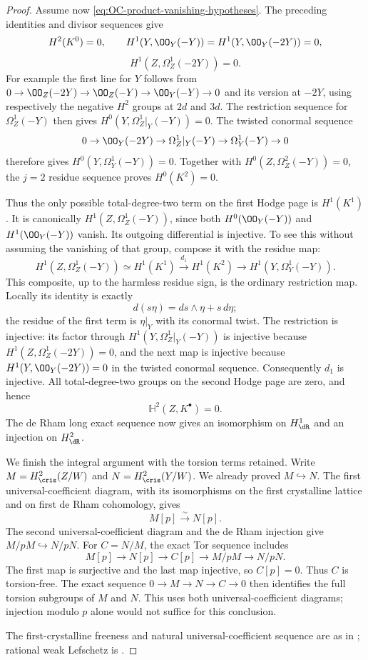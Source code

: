 \begin{proof}
Assume now \eqref{eq:OC-product-vanishing-hypotheses}.  The preceding identities and divisor sequences give
\[
 H^2(K^0)=0,\qquad
 H^1(Y,\OO_Y(-Y))=H^1(Y,\OO_Y(-2Y))=0,
\]
\[
                     H^1(Z,\Omega_Z^1(-2Y))=0.
\]
For example the first line for $Y$ follows from
$0\to\OO_Z(-2Y)\to\OO_Z(-Y)\to\OO_Y(-Y)\to0$
and its version at $-2Y$, using respectively the negative $H^2$ groups at $2d$ and $3d$.
The restriction sequence for $\Omega_Z^1(-Y)$ then gives
$H^0(Y,\Omega_Z^1|_Y(-Y))=0$.
The twisted conormal sequence
\[
 0\to\OO_Y(-2Y)\to\Omega_Z^1|_Y(-Y)\to\Omega_Y^1(-Y)\to0
\]
therefore gives $H^0(Y,\Omega_Y^1(-Y))=0$.
Together with $H^0(Z,\Omega_Z^2(-Y))=0$, the $j=2$ residue sequence proves $H^0(K^2)=0$.

Thus the only possible total-degree-two term on the first Hodge page is $H^1(K^1)$.  It is canonically $H^1(Z,\Omega_Z^1(-Y))$, since both $H^0(\OO_Y(-Y))$ and $H^1(\OO_Y(-Y))$ vanish.  Its outgoing differential is injective.  To see this without assuming the vanishing of that group, compose it with the residue map:
\[
 H^1(Z,\Omega_Z^1(-Y))\simeq H^1(K^1)
 \xrightarrow{d_1}H^1(K^2)
 \longrightarrow H^1(Y,\Omega_Y^1(-Y)).
\]
This composite, up to the harmless residue sign, is the ordinary restriction map.  Locally its identity is exactly
\[
                      d(s\eta)=ds\wedge\eta+s\,d\eta;
\]
the residue of the first term is $\eta|_Y$ with its conormal twist.
The restriction is injective: its factor through
$H^1(Y,\Omega_Z^1|_Y(-Y))$ is injective because
$H^1(Z,\Omega_Z^1(-2Y))=0$, and the next map is injective because
$H^1(Y,\OO_Y(-2Y))=0$ in the twisted conormal sequence.
Consequently $d_1$ is injective.  All total-degree-two groups on the second Hodge page are zero, and hence
\[
                          \mathbb H^2(Z,K^\bullet)=0.
\]
The de Rham long exact sequence now gives an isomorphism on $H^1_{\dR}$ and an injection on $H^2_{\dR}$.

We finish the integral argument with the torsion terms retained.  Write
$M=H^2_{\cris}(Z/W)$ and $N=H^2_{\cris}(Y/W)$.  We already proved $M\hookrightarrow N$.  The first universal-coefficient diagram, with its isomorphisms on the first crystalline lattice and on first de Rham cohomology, gives
\[
                              M[p]\xrightarrow{\sim}N[p].
\]
The second universal-coefficient diagram and the de Rham injection give
$M/pM\hookrightarrow N/pN$.
For $C=N/M$, the exact Tor sequence includes
\[
 M[p]\longrightarrow N[p]\longrightarrow C[p]
                 \longrightarrow M/pM\longrightarrow N/pN.
\]
The first map is surjective and the last map injective, so $C[p]=0$.
Thus $C$ is torsion-free.  The exact sequence $0\to M\to N\to C\to0$ then identifies the full torsion subgroups of $M$ and $N$.  This uses both universal-coefficient diagrams; injection modulo $p$ alone would not suffice for this conclusion.

The first-crystalline freeness and natural universal-coefficient sequence are as in
\cite[II, Proposition~3.11 and Remark~3.11.2]{Illusie1979DRW}; rational weak Lefschetz is
\cite[Appendix~9, Corollary~9.3, pp.~63--64, version~3]{NakkajimaYobuko2022}.
\end{proof}

